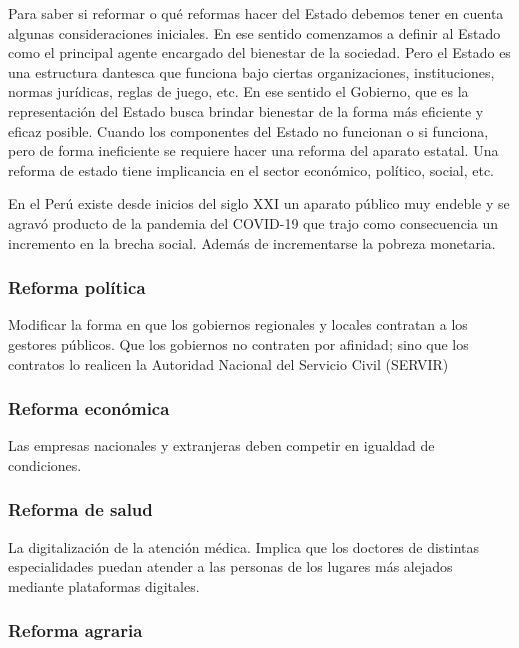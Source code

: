 \documentclass[
  letterpaper,
  DIV=11,
  numbers=noendperiod]{scrartcl}
\begin{document}
Para saber si reformar o qué reformas hacer del Estado debemos tener en
cuenta algunas consideraciones iniciales. En ese sentido comenzamos a
definir al Estado como el principal agente encargado del bienestar de la
sociedad. Pero el Estado es una estructura dantesca que funciona bajo
ciertas organizaciones, instituciones, normas jurídicas, reglas de
juego, etc. En ese sentido el Gobierno, que es la representación del
Estado busca brindar bienestar de la forma más eficiente y eficaz
posible. Cuando los componentes del Estado no funcionan o si funciona,
pero de forma ineficiente se requiere hacer una reforma del aparato
estatal. Una reforma de estado tiene implicancia en el sector económico,
político, social, etc.

En el Perú existe desde inicios del siglo XXI un aparato público muy
endeble y se agravó producto de la pandemia del COVID-19 que trajo como
consecuencia un incremento en la brecha social. Además de incrementarse
la pobreza monetaria.

\hypertarget{reforma-poluxedtica}{%
\subsubsection{Reforma política}\label{reforma-poluxedtica}}

Modificar la forma en que los gobiernos regionales y locales contratan a
los gestores públicos. Que los gobiernos no contraten por afinidad; sino
que los contratos lo realicen la Autoridad Nacional del Servicio Civil
(SERVIR)

\hypertarget{reforma-econuxf3mica}{%
\subsubsection{Reforma económica}\label{reforma-econuxf3mica}}

Las empresas nacionales y extranjeras deben competir en igualdad de
condiciones.

\hypertarget{reforma-de-salud}{%
\subsubsection{Reforma de salud}\label{reforma-de-salud}}

La digitalización de la atención médica. Implica que los doctores de
distintas especialidades puedan atender a las personas de los lugares
más alejados mediante plataformas digitales.

\hypertarget{reforma-agraria}{%
\subsubsection{Reforma agraria}\label{reforma-agraria}}
\end{document}
